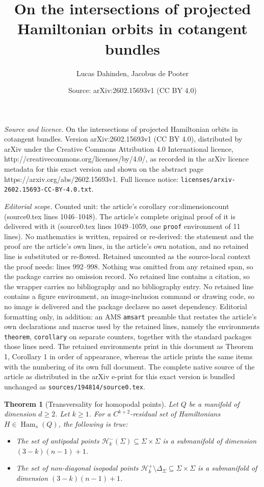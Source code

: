 \documentclass[10pt,a4paper]{amsart}
\title{On the intersections of projected Hamiltonian orbits in cotangent bundles}
\author{Lucas Dahinden, Jacobus de Pooter}
\date{Source: arXiv:2602.15693v1 (CC BY 4.0)}
\newtheorem{theorem}{Theorem}
\newcommand{\Ham}{\operatorname{Ham}}
\newcommand{\Hcal}{{\mathcal{H}}}
\begin{document}
\maketitle

\noindent\emph{Source and licence.} On the intersections of projected Hamiltonian orbits in cotangent bundles. Version arXiv:2602.15693v1 (CC BY 4.0), distributed by arXiv under the Creative Commons Attribution 4.0 International licence, http://creativecommons.org/licenses/by/4.0/, as recorded in the arXiv licence metadata for this exact version and shown on the abstract page https://arxiv.org/abs/2602.15693v1. Full licence notice: \texttt{licenses/arxiv-2602.15693-CC-BY-4.0.txt}.\par\smallskip

\noindent\textit{Editorial scope.} Counted unit: the article's corollary cor:dimensioncount (source0.tex lines 1046--1048). The article's complete original proof of it is delivered with it (source0.tex lines 1049--1059, one \texttt{proof} environment of 11 lines). No mathematics is written, repaired or re-derived: the statement and the proof are the article's own lines, in the article's own notation, and no retained line is substituted or re-flowed.  Retained uncounted as the source-local context the proof needs: lines 992--998.  Nothing was omitted from any retained span, so the package carries no omission record.  No retained line contains a citation, so the wrapper carries no bibliography and no bibliography entry.  No retained line contains a figure environment, an image-inclusion command or drawing code, so no image is delivered and the package declares no asset dependency.  Editorial formatting only, in addition: an AMS \texttt{amsart} preamble that restates the article's own declarations and macros used by the retained lines, namely the environments \texttt{theorem}, \texttt{corollary} on separate counters, together with the standard packages those lines need.  The retained environments print in this document as Theorem 1, Corollary 1 in order of appearance, whereas the article prints the same items with the numbering of its own full document.  The complete native source of the article as distributed in the arXiv e-print for this exact version is bundled unchanged as \texttt{sources/194814/source0.tex}.
\begin{theorem}[Transversality for homopodal points]\label{thm:homopodaltransversality}
    Let $Q$ be a manifold of dimension $d\geq 2$. Let $k\geq 1$. For a $C^{k+2}$-residual set of Hamiltonians $H\in \Ham_s(Q)$, the following is true:
    \begin{itemize}
        \item The set of antipodal points $\Hcal^-_k(\Sigma)\subseteq \Sigma\times\Sigma$ is a submanifold of dimension $(3-k)(n-1)+1$.
        \item The set of non-diagonal isopodal points $\Hcal^+_k\setminus \Delta_\Sigma\subseteq \Sigma\times\Sigma$ is a submanifold of dimension $(3-k)(n-1)+1$. 
    \end{itemize}
\end{theorem}
\end{document}
